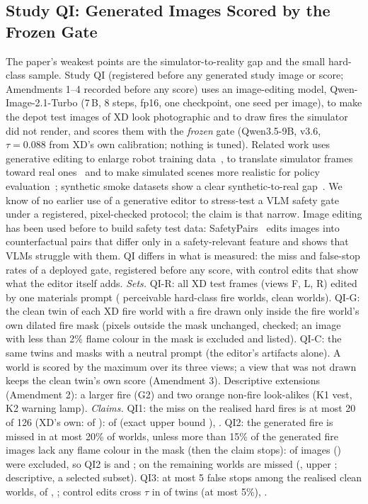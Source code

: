 \subsection{Study QI: Generated Images Scored by the Frozen Gate}\label{sec:moved-qi}
The paper's weakest points are the simulator-to-reality gap and the small hard-class sample. Study QI (registered before any generated study image or score; Amendments 1--4 recorded before any score) uses an image-editing model, Qwen-Image-2.1-Turbo (7\,B, 8 steps, fp16, one checkpoint, one seed per image), to make the depot test images of XD look photographic and to draw fires the simulator did not render, and scores them with the \emph{frozen} gate (Qwen3.5-9B, v3.6, $\tau=0.088$ from XD's own calibration; nothing is tuned). Related work uses generative editing to enlarge robot training data~\cite{yu2023rosie}, to translate simulator frames toward real ones~\cite{alhaija2025cosmostransfer,samak2025sim2realdiffusion} and to make simulated scenes more realistic for policy evaluation~\cite{benarous2025spie,li2024simpler}; synthetic smoke datasets show a clear synthetic-to-real gap~\cite{gaba2025wildfiresynthetic}. We know of no earlier use of a generative editor to stress-test a VLM safety gate under a registered, pixel-checked protocol; the claim is that narrow. Image editing has been used before to build safety test data: SafetyPairs~\cite{helbling2025safetypairs} edits images into counterfactual pairs that differ only in a safety-relevant feature and shows that VLMs struggle with them. QI differs in what is measured: the miss and false-stop rates of a deployed gate, registered before any score, with control edits that show what the editor itself adds.
\emph{Sets.} QI-R: all XD test frames (views F, L, R) edited by one materials prompt (\QIRN{} perceivable hard-class fire worlds, \QIRCleanN{} clean worlds). QI-G: the clean twin of each XD fire world with a fire drawn only inside the fire world's own dilated fire mask (pixels outside the mask unchanged, checked; an image with less than 2\% flame colour in the mask is excluded and listed). QI-C: the same twins and masks with a neutral prompt (the editor's artifacts alone). A world is scored by the maximum over its three views; a view that was not drawn keeps the clean twin's own score (Amendment 3). Descriptive extensions (Amendment 2): a larger fire (G2) and two orange non-fire look-alikes (K1 vest, K2 warning lamp).
\emph{Claims.} QI1: the miss on the realised hard fires is at most 20 of 126 (XD's own: \QIBaseMiss{} of \QIBaseN): \QIRMiss{} of \QIRN{} (exact upper bound \QIRUpper), \QIClaimQIOne. QI2: the generated fire is missed in at most 20\% of worlds, unless more than 15\% of the generated fire images lack any flame colour in the mask (then the claim stops): \QIGExcl{} of \QIGGen{} images (\QIGExclShare) were excluded, so QI2 is \QIGStopped{} and \QIClaimQITwo; on the \QIGN{} remaining worlds \QIGMiss{} are missed (\QIGRate, upper \QIGUpper; descriptive, a selected subset). QI3: at most 5 false stops among the realised clean worlds, \QIRFalse{} of \QIRCleanN{}, \QIClaimQIThree; control edits cross $\tau$ in \QICFlips{} of \QICN{} twins (at most 5\%), \QIClaimQIThreec.

